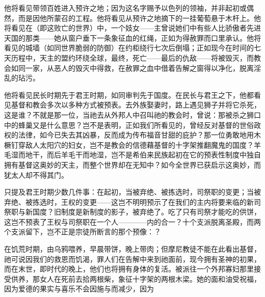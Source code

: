 他将看见带领百姓进入预许之地；因为这名字赐予以色列的领袖，并非起初或偶然，而是因他所蒙召的工程。他将看见从预许之地摘下的一挂葡萄悬于木杆上。他将看见在（即这败亡的世界）中，一个妓女——主曾说她们中有些人比骄傲者先进天国的那类——她从窗户垂下一条象征血的红绳，正如为得赦罪而口里承认。他将看见的城墙（如同世界脆弱的防御）在约柜绕行七次后倒塌；正如现今在时间的七天历程中，天主的盟约环绕全球，最终，死亡——最后的仇敌——将被毁灭，而教会如同一家，从恶人的毁灭中得救，在赦罪之血中借着告解之窗得以净化，脱离淫乱的玷污。\par

他将看见民长时期先于君王时期，如同审判先于国度。在民长与君王之下，他都看见基督和教会多次以多种方式被预表。去外族娶妻时，路上遇见狮子并将它杀死，这是谁？不就是那一位，当祂去从外邦人中召叫祂的教会时，曾说：那被杀之狮口中的蜂巢又是什么意思？岂不是表明，正如我们所看见的，曾经反对基督的世俗政权的法律，如今已失去其凶暴，反而成为传布福音甘甜的庇护？那一位勇敢地用木橛钉穿敌人太阳穴的妇女，岂不是教会的信德藉基督的十字架推翻魔鬼的国度？羊毛湿而地干，而后羊毛干而地湿，岂不是希伯来民族起初在它的预表性制度中独自拥有基督这奥妙的天主，而整个世界却在无知中？如今全世界已获启示这奥妙，而犹太人却不得其门。\par

只提及君王时期少数几件事：在起初，当被弃绝、被拣选时，司祭职的变更；当被弃绝、被拣选时，王权的变更——这岂不明明预示了在我们的主内将要来临的新司祭职与新国度？旧制度是新制度的影子，被弃绝了。吃了只有司祭才能吃的供饼，这岂不预表了王权与司祭职在一个人————内的合一？十个支派脱离圣殿，而两个支派留下，岂不正是宗徒所断言的那个预像：？\par

在饥荒时期，由乌鸦喂养，早晨带饼，晚上带肉；但摩尼教徒不能在此看出基督，祂可说因我们的救恩而饥渴，罪人们在告解中来到祂面前，现今拥有圣神的初果，而在末世，即时代的晚上，他们也将拥有身体的复活。被派往一个外邦寡妇那里接受供养，那女人在死前去拾两根柴，象征十字架的两根木梁。她的面和油受祝福，因为爱德的果实与喜乐不会因施与而减少，因为\par

